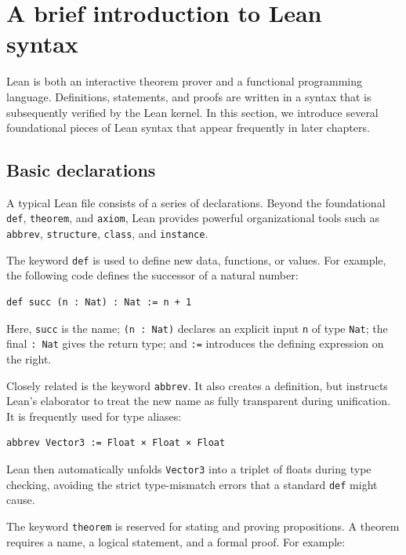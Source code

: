 \section{A brief introduction to Lean syntax}

Lean is both an interactive theorem prover and a functional programming language.
Definitions, statements, and proofs are written in a syntax that is
subsequently verified by the Lean kernel. In this section, we introduce several
foundational pieces of Lean syntax that appear frequently in later chapters.

\subsection{Basic declarations}

A typical Lean file consists of a series of declarations. Beyond the foundational
\lstinline|def|, \lstinline|theorem|, and \lstinline|axiom|, Lean provides
powerful organizational tools such as \lstinline|abbrev|, \lstinline|structure|,
\lstinline|class|, and \lstinline|instance|.

The keyword \lstinline|def| is used to define new data, functions, or values.
For example, the following code defines the successor of a natural number:

\begin{lstlisting}[language=Lean]
def succ (n : Nat) : Nat := n + 1
\end{lstlisting}

Here, \lstinline|succ| is the name; \lstinline|(n : Nat)| declares an explicit input \lstinline|n| of type \lstinline|Nat|; the final \lstinline|: Nat| gives the return type; and \lstinline|:=| introduces the defining expression on the right.

Closely related is the keyword \lstinline|abbrev|. It also creates a definition, but instructs Lean's elaborator to treat the new name as fully transparent during unification. It is frequently used for type aliases:

\begin{lstlisting}[language=Lean]
abbrev Vector3 := Float × Float × Float
\end{lstlisting}

Lean then automatically unfolds \lstinline|Vector3| into a triplet of floats during type checking, avoiding the strict type-mismatch errors that a standard \lstinline|def| might cause.

The keyword \lstinline|theorem| is reserved for stating and proving propositions. A theorem requires a name, a logical statement, and a formal proof. For example:

